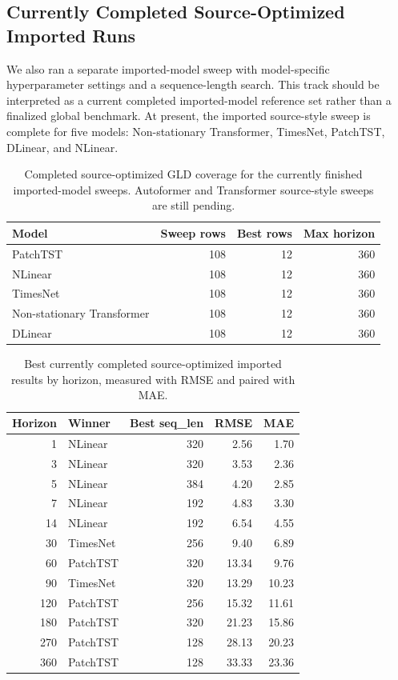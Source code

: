 \subsection{Currently Completed Source-Optimized Imported Runs}

We also ran a separate imported-model sweep with model-specific hyperparameter settings and a sequence-length search.
This track should be interpreted as a current completed imported-model reference set rather than a finalized global benchmark.
At present, the imported source-style sweep is complete for five models: Non-stationary Transformer, TimesNet, PatchTST, DLinear, and NLinear.

\begin{table}[t]
\centering
\caption{Completed source-optimized GLD coverage for the currently finished imported-model sweeps. Autoformer and Transformer source-style sweeps are still pending.}
\label{tab:gld-source-optimized-partial}
\small
\begin{tabular}{lrrr}
\toprule
Model & Sweep rows & Best rows & Max horizon \\
\midrule
PatchTST & 108 & 12 & 360 \\
NLinear & 108 & 12 & 360 \\
TimesNet & 108 & 12 & 360 \\
Non-stationary Transformer & 108 & 12 & 360 \\
DLinear & 108 & 12 & 360 \\
\bottomrule
\end{tabular}
\end{table}

\begin{table}[t]
\centering
\caption{Best currently completed source-optimized imported results by horizon, measured with RMSE and paired with MAE.}
\label{tab:gld-source-optimized-best}
\small
\begin{tabular}{r l r r r}
\toprule
Horizon & Winner & Best seq\_len & RMSE & MAE \\
\midrule
1 & NLinear & 320 & 2.56 & 1.70 \\
3 & NLinear & 320 & 3.53 & 2.36 \\
5 & NLinear & 384 & 4.20 & 2.85 \\
7 & NLinear & 192 & 4.83 & 3.30 \\
14 & NLinear & 192 & 6.54 & 4.55 \\
30 & TimesNet & 256 & 9.40 & 6.89 \\
60 & PatchTST & 320 & 13.34 & 9.76 \\
90 & TimesNet & 320 & 13.29 & 10.23 \\
120 & PatchTST & 256 & 15.32 & 11.61 \\
180 & PatchTST & 320 & 21.23 & 15.86 \\
270 & PatchTST & 128 & 28.13 & 20.23 \\
360 & PatchTST & 128 & 33.33 & 23.36 \\
\bottomrule
\end{tabular}
\end{table}

